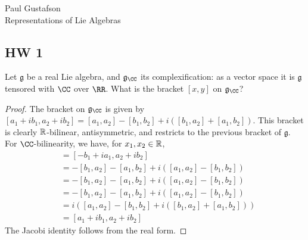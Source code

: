 \documentclass{article}
\begin{document}
\noindent Paul Gustafson\\
\noindent Representations of Lie Algebras

\newcommand{\mf}{\mathfrak}


\subsection*{HW 1}
 Let $\mf g$ be a real Lie algebra, and $\mf g_{\CC}$ its complexification: as a vector space it is $\mf g$ tensored with $\CC$ over $\RR$.  What is the bracket $[x,y]$ on $\mf g_{\CC}$?  
\begin{proof}
The bracket on $\mf g_{\CC}$ is given by $[a_1 + i b_1, a_2 + i b_2] = [a_1, a_2] - [b_1, b_2] + i([b_1,a_2] + [a_1, b_2])$.  This bracket is clearly $\mathbb{R}$-bilinear, antisymmetric, and restricts to the previous bracket of $\mf g$.  For $\CC$-bilinearity, we have, for $x_1,x_2 \in \mathbb{R}$,
\begin{align*}
[i (a_1 + i b_1), a_2 + i b_2] & = [- b_1 + ia_1, a_2 + i b_2] \\
& = -[b_1, a_2] - [a_1, b_2] + i( [a_1,a_2] - [b_1, b_2]) \\
& = -[b_1, a_2] - [a_1, b_2] + i( [a_1,a_2] - [b_1, b_2]) \\
& = -[b_1, a_2] - [a_1, b_2] + i( [a_1,a_2] - [b_1, b_2]) \\
& = i ([a_1, a_2] - [b_1, b_2] + i([b_1,a_2] + [a_1, b_2])) \\
& = [a_1 + i b_1, a_2 + i b_2]
\end{align*}
The Jacobi identity follows from the real form.
\end{proof}
\end{document}
